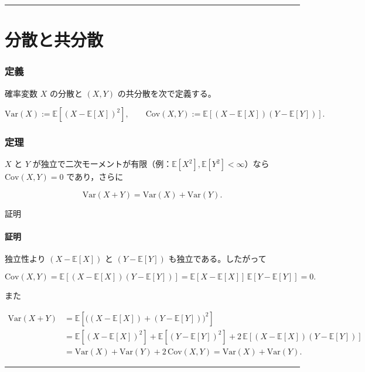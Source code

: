 \documentclass[uplatex,dvipdfmx,11pt,a4paper,openany]{bxjsbook}
\begin{document}
\medskip\hrule\medskip
\section{分散と共分散}
\subsubsection{定義}
確率変数 $X$ の分散と $(X,Y)$ の共分散を次で定義する。

\[\mathrm{Var}(X) := \mathbb E[(X-\mathbb E[X])^2],
                \qquad
                \mathrm{Cov}(X,Y) := \mathbb E[(X-\mathbb E[X])(Y-\mathbb E[Y])].\]

\subsubsection{定理}
$X$ と $Y$ が独立で二次モーメントが有限（例：$\mathbb E[X^2],\mathbb E[Y^2]<\infty$）なら
                $\mathrm{Cov}(X,Y)=0$ であり，さらに

\[\mathrm{Var}(X+Y)=\mathrm{Var}(X)+\mathrm{Var}(Y).\]

\begin{detailblock}{証明}
\paragraph{証明}
独立性より $(X-\mathbb E[X])$ と $(Y-\mathbb E[Y])$ も独立である。したがって

\[\mathrm{Cov}(X,Y)
                        = \mathbb E[(X-\mathbb E[X])(Y-\mathbb E[Y])]
                        = \mathbb E[X-\mathbb E[X]]\,\mathbb E[Y-\mathbb E[Y]]
                        = 0.\]

また

\[\begin{aligned}
                        \mathrm{Var}(X+Y)
                        &= \mathbb E\!\left[\bigl((X-\mathbb E[X])+(Y-\mathbb E[Y])\bigr)^2\right]\\
                        &= \mathbb E[(X-\mathbb E[X])^2] + \mathbb E[(Y-\mathbb E[Y])^2]
                        + 2\,\mathbb E[(X-\mathbb E[X])(Y-\mathbb E[Y])]\\
                        &= \mathrm{Var}(X)+\mathrm{Var}(Y)+2\,\mathrm{Cov}(X,Y)
                        = \mathrm{Var}(X)+\mathrm{Var}(Y).
                        \end{aligned}\]


\end{detailblock}

\medskip\hrule\medskip
\end{document}
